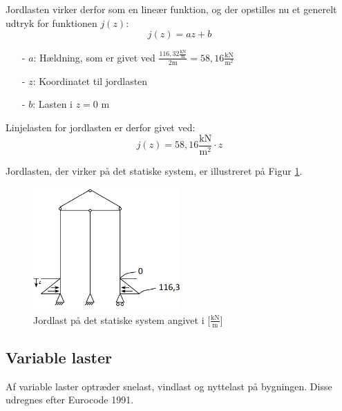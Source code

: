 Jordlasten virker derfor som en lineær funktion, og der opstilles nu et generelt udtryk for funktionen $j(z)$: 
\begin{equation}
	j(z) = a z + b
\end{equation}

\begin{itemize}
	\item[-] $a$: Hældning, som er givet ved $\frac{116,32 \frac{\text{kN}}{\text{m}}}{2 \text{m}} = 58,\!16 \frac{\text{kN}}{\text{m}^2}$
	\item[-] $z$: Koordinatet til jordlasten
	\item[-] $b$: Lasten i $z = 0$ m
\end{itemize}

Linjelasten for jordlasten er derfor givet ved: 
\begin{equation}
	j(z) = 58,\!16 \frac{\text{kN}}{\text{m}^2} \cdot z
\end{equation}

Jordlasten, der virker på det statiske system, er illustreret på Figur \ref{fig:jordlast}.

\begin{figure}[H]
	\centering
	\includegraphics[width=0.5\textwidth]{billeder/jordlast.png}
	\caption{Jordlast på det statiske system angivet i [$\frac{\text{kN}}{\text{m}}$]}
	\label{fig:jordlast}
\end{figure}

\subsection{Variable laster}
Af variable laster optræder snelast, vindlast og nyttelast på bygningen. Disse udregnes efter Eurocode 1991.

